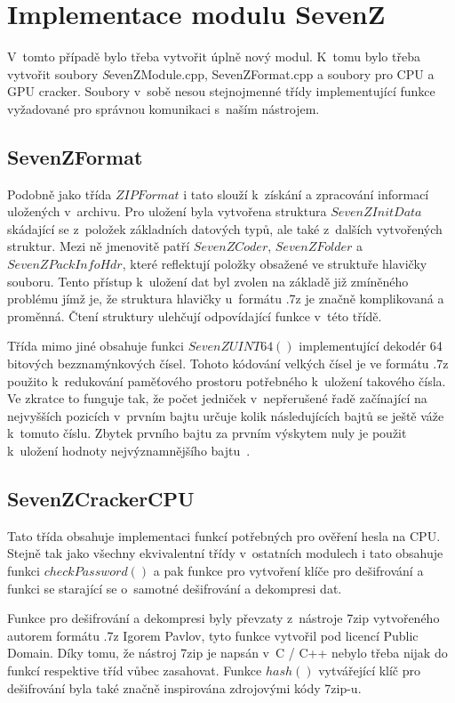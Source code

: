 \section{Implementace modulu SevenZ}
V~tomto případě bylo třeba vytvořit úplně nový modul. K~tomu bylo třeba vytvořit soubory {\textit
SevenZModule.cpp, SevenZFormat.cpp} a soubory pro CPU a GPU cracker. Soubory v~sobě nesou
stejnojmenné třídy implementující funkce vyžadované pro správnou komunikaci s~naším nástrojem.

\subsection{SevenZFormat}
Podobně jako třída $ZIPFormat$ i tato slouží k~získání a zpracování informací uložených
v~archivu. Pro uložení byla vytvořena struktura $SevenZInitData$ skádající se z~položek základních
datových typů, ale také z~dalších vytvořených struktur. Mezi ně jmenovitě patří $SevenZCoder$,
$SevenZFolder$ a $SevenZPackInfoHdr$, které reflektují položky obsažené ve struktuře hlavičky
souboru. Tento přístup k~uložení dat byl zvolen na základě již zmíněného problému jímž je, že
struktura hlavičky u~formátu .7z je značně komplikovaná a proměnná. Čtení struktury ulehčují
odpovídající funkce v~této třídě.

 Třída mimo jiné obsahuje funkci $SevenZUINT64()$ implementující dekodér 64 bitových
bezznamýnkových čísel. Tohoto kódování velkých čísel je ve formátu .7z použito k~redukování
paměťového prostoru potřebného k~uložení takového čísla. Ve zkratce to funguje tak, že počet
jedniček v~nepřerušené řadě začínající na nejvyšších pozicích v~prvním bajtu určuje kolik
následujících bajtů se ještě váže k~tomuto číslu. Zbytek prvního bajtu za prvním výskytem nuly je
použit k~uložení hodnoty nejvýznamnějšího bajtu~\cite{Pavlov:2010}. 

\subsection{SevenZCrackerCPU}
\label{ssec:7zcrackercpu}
Tato třída obsahuje implementaci funkcí potřebných pro ověření hesla na CPU. Stejně tak jako
všechny ekvivalentní třídy v~ostatních modulech i tato obsahuje funkci $checkPassword()$ a pak
funkce pro vytvoření klíče pro dešifrování a funkci se starající se o~samotné dešifrování a
dekompresi dat.

 Funkce pro dešifrování a dekompresi byly převzaty z~nástroje 7zip vytvořeného autorem formátu .7z
Igorem Pavlov, tyto funkce vytvořil pod licencí Public Domain. Díky tomu, že nástroj 7zip je
napsán v~C / C++ nebylo třeba nijak do funkcí respektive tříd vůbec zasahovat. Funkce $hash()$
vytvářející klíč pro dešifrování byla také značně inspirována zdrojovými kódy 7zip-u. 

